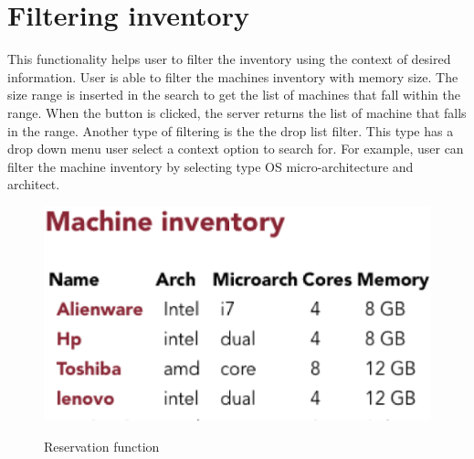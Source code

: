 \section*{Filtering inventory}
This functionality helps user to filter the inventory using the context of desired information. User is able to filter the machines inventory with memory size. The size range is inserted in the search to get the list of machines that fall within the range. When the button is clicked, the  server returns the list of machine that falls in the range. Another type of filtering is the the drop list filter. This type has a drop down menu user select a context option to search for. For example, user can filter the machine inventory by selecting type OS micro-architecture and architect.
\begin{figure}[h]
  \includegraphics[width=\linewidth]{update.eps}
  \label{fig:reserve}
  \caption{Reservation function}
\end{figure}
\pagebreak

